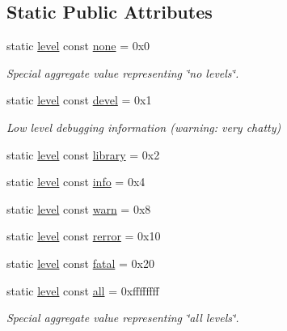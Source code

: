 \subsection*{Static Public Attributes}
\begin{DoxyCompactItemize}
\item 
static \hyperlink{namespacewebsocketpp_1_1log_a12d4d17939f102db8c9183d400a41960}{level} const \hyperlink{structwebsocketpp_1_1log_1_1elevel_ae86395aa26ec2089e07fd63b62a549fa}{none} = 0x0
\begin{DoxyCompactList}\small\item\em Special aggregate value representing \char`\"{}no levels\char`\"{}. \end{DoxyCompactList}\item 
static \hyperlink{namespacewebsocketpp_1_1log_a12d4d17939f102db8c9183d400a41960}{level} const \hyperlink{structwebsocketpp_1_1log_1_1elevel_a0b1dbc650c6f2711522c096496423726}{devel} = 0x1
\begin{DoxyCompactList}\small\item\em Low level debugging information (warning\+: very chatty) \end{DoxyCompactList}\item 
static \hyperlink{namespacewebsocketpp_1_1log_a12d4d17939f102db8c9183d400a41960}{level} const \hyperlink{structwebsocketpp_1_1log_1_1elevel_a2b862d4f143d9b77619ddbacd1763674}{library} = 0x2
\item 
static \hyperlink{namespacewebsocketpp_1_1log_a12d4d17939f102db8c9183d400a41960}{level} const \hyperlink{structwebsocketpp_1_1log_1_1elevel_a3ab47987a682f0de7b1d0df8c9c3b9d2}{info} = 0x4
\item 
static \hyperlink{namespacewebsocketpp_1_1log_a12d4d17939f102db8c9183d400a41960}{level} const \hyperlink{structwebsocketpp_1_1log_1_1elevel_aef51fd791400121297f38f4381edaebe}{warn} = 0x8
\item 
static \hyperlink{namespacewebsocketpp_1_1log_a12d4d17939f102db8c9183d400a41960}{level} const \hyperlink{structwebsocketpp_1_1log_1_1elevel_ae8a9a9f8b1fa45a731acd340e10aa342}{rerror} = 0x10
\item 
static \hyperlink{namespacewebsocketpp_1_1log_a12d4d17939f102db8c9183d400a41960}{level} const \hyperlink{structwebsocketpp_1_1log_1_1elevel_aa909808e0fb142742a0ebd2dca54f517}{fatal} = 0x20
\item 
static \hyperlink{namespacewebsocketpp_1_1log_a12d4d17939f102db8c9183d400a41960}{level} const \hyperlink{structwebsocketpp_1_1log_1_1elevel_a9b31ff708c221d314f9f4eb3ff2b1ad7}{all} = 0xffffffff
\begin{DoxyCompactList}\small\item\em Special aggregate value representing \char`\"{}all levels\char`\"{}. \end{DoxyCompactList}\end{DoxyCompactItemize}



